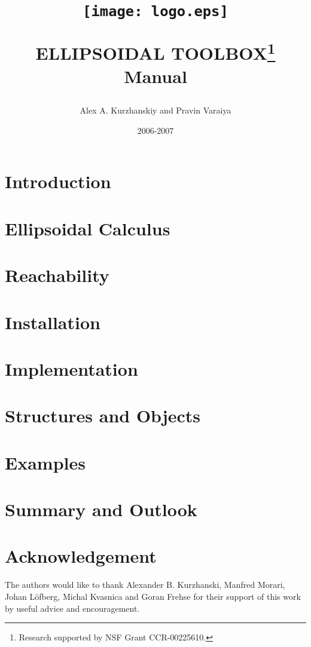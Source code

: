 \documentclass{report}
\title{
\begin{figure}[htbp]
\centerline{
\texttt{[image: logo.eps]}}
\end{figure}
ELLIPSOIDAL TOOLBOX\thanks{Research supported by NSF Grant CCR-00225610.}\\
Manual
\author{Alex A. Kurzhanskiy and Pravin Varaiya}
\date{2006-2007}
}
\begin{document}
\maketitle
\tableofcontents

\chapter{Introduction}\label{ch_intro}


\chapter{Ellipsoidal Calculus}\label{ch_ellcalc}


\chapter{Reachability}\label{ch_reachability}


\chapter{Installation}\label{ch_install}


\chapter{Implementation}\label{ch_implementation}


\chapter{Structures and Objects}\label{ch_objects}


\chapter{Examples}\label{ch_examples}


\chapter{Summary and Outlook}\label{ch_summary}


\chapter*{Acknowledgement}
The authors would like to thank Alexander B. Kurzhanski,
Manfred Morari, Johan L{\"o}fberg, Michal Kvasnica and Goran Frehse
for their support of this work by useful advice and encouragement.
\end{document}
